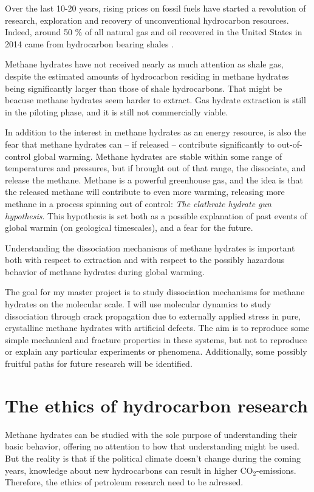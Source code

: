 Over the last 10-20 years, rising prices on fossil fuels have started a revolution of research, exploration and recovery of unconventional hydrocarbon resources. Indeed, around 50 \% of all natural gas and oil recovered in the United States in 2014 came from hydrocarbon bearing shales \cite{EIA2015}.

Methane hydrates have not received nearly as much attention as shale gas, despite the estimated amounts of hydrocarbon residing in methane hydrates being significantly larger than those of shale hydrocarbons. That might be beacuse methane hydrates seem harder to extract. Gas hydrate extraction is still in the piloting phase, and it is still not commercially viable.

In addition to the interest in methane hydrates as an energy resource, is also the fear that methane hydrates can -- if released -- contribute significantly to out-of-control global warming. Methane hydrates are stable within some range of temperatures and pressures, but if brought out of that range, the dissociate, and release the methane. Methane is a powerful greenhouse gas, and the idea is that the released methane will contribute to even more warming, releasing more methane in a process spinning out of control: \emph{The clathrate hydrate gun hypothesis}. This hypothesis is set both as a possible explanation of past events of global warmin (on geological timescales), and a fear for the future.

Understanding the dissociation mechanisms of methane hydrates is important both with respect to extraction and with respect to the possibly hazardous behavior of methane hydrates during global warming. 

The goal for my master project is to study dissociation mechanisms for methane hydrates on the molecular scale. I will use molecular dynamics to study dissociation through crack propagation due to externally applied stress in pure, crystalline methane hydrates with artificial defects. The aim is to reproduce some simple mechanical and fracture properties in these systems, but not to reproduce or explain any particular experiments or phenomena. Additionally, some possibly fruitful paths for future research will be identified.

\section{The ethics of hydrocarbon research}
Methane hydrates can be studied with the sole purpose of understanding their basic behavior, offering no attention to how that understanding might be used. But the reality is that if the political climate doesn't change during the coming years, knowledge about new hydrocarbons can result in higher CO$_2$-emissions. Therefore, the ethics of petroleum research need to be adressed.

